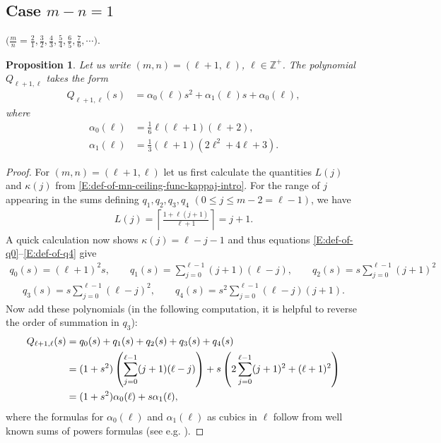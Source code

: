\documentclass[letterpaper,11pt,reqno]{amsart}
\theoremstyle{plain}
\newtheorem{proposition}[equation]{Proposition}
\theoremstyle{definition}
\theoremstyle{remark}
\theoremstyle{remark}
\numberwithin{equation}{section}
\newcommand{\Z}{{\mathbb Z}}
\begin{document}
\subsection{Case $m-n=1$}\label{SS:k=1}
$\big(\frac{m}{n} = \frac{2}{1}, \frac{3}{2}, \frac{4}{3}, \frac{5}{4}, \frac{6}{5}, \frac{7}{6}, \cdots \big)$.
 
\begin{proposition}\label{P:k=1-form-of-poly}
Let us write $(m,n) = (\ell+1, \ell)$, $\ell \in \Z^+$. 
The polynomial $Q_{\ell+1,\ell}$ takes the form
\begin{align*}
Q_{\ell+1,\ell}(s) &= \alpha_0(\ell) s^2 + \alpha_1(\ell) s + \alpha_0(\ell),
\end{align*}
where
\begin{align*}
\alpha_0(\ell) &= \tfrac{1}{6}\ell(\ell+1)(\ell+2), \\
\alpha_1(\ell) &= \tfrac{1}{3}(\ell+1)(2\ell^2+4\ell+3).
\end{align*}
\end{proposition}
\begin{proof}
For $(m,n) = (\ell+1,\ell)$ let us first calculate the quantities $L(j)$ and $\kappa(j)$ from \eqref{E:def-of-mn-ceiling-func-kappaj-intro}.
For the range of $j$ appearing in the sums defining $q_1,q_2,q_3,q_4$ $(0 \le j \le m-2 = \ell - 1)$, we have
\begin{align}\label{E:L(j)-k=1}
L(j) = \left\lceil \frac{1+\ell(j+1)}{\ell+1} \right\rceil 
= j+1.
\end{align}
A quick calculation now shows $\kappa(j) = \ell - j - 1$ and thus equations \eqref{E:def-of-q0}--\eqref{E:def-of-q4} give
\begin{align*}
q_0(s) = (\ell+1)^2 s, \qquad q_1(s) = \sum_{j=0}^{\ell-1} (j+1)(\ell-j), \qquad q_2(s) = s \sum_{j=0}^{\ell-1} (j+1)^2
\end{align*}
\begin{align*}
q_3(s) = s \sum_{j=0}^{\ell-1} (\ell-j)^2, \qquad q_4(s) = s^{2} \sum_{j=0}^{\ell-1} (\ell-j)(j+1).
\end{align*}
Now add these polynomials (in the following computation, it is helpful to reverse the order of summation in $q_3$):
\begin{align*}
Q_{\ell+1,\ell}(s) 
&= q_0(s) + q_1(s) + q_2(s) + q_3(s) + q_4(s) \notag \\
&= (1 + s^{2}) \left( \sum_{j=0}^{\ell-1} (j+1)(\ell-j) \right) + s\left( 2\sum_{j=0}^{\ell-1} (j+1)^2 + (\ell+1)^2 \right) \notag \\
&= (1 + s^{2}) \alpha_0(\ell) + s\alpha_1(\ell),
\end{align*}
where the formulas for $\alpha_0(\ell)$ and $\alpha_1(\ell)$ as cubics in $\ell$ follow from well known sums of powers formulas (see e.g. \cite{GrKuPa94}).
\end{proof}
\end{document}
